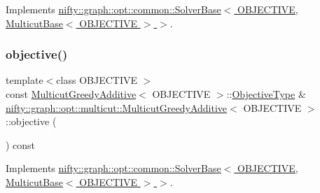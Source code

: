 Implements \hyperlink{classnifty_1_1graph_1_1opt_1_1common_1_1SolverBase_af638b9a804cfec3e35fe87c77e942d30}{nifty\+::graph\+::opt\+::common\+::\+Solver\+Base$<$ O\+B\+J\+E\+C\+T\+I\+V\+E, Multicut\+Base$<$ O\+B\+J\+E\+C\+T\+I\+V\+E $>$ $>$}.

\mbox{\label{classnifty_1_1graph_1_1opt_1_1multicut_1_1MulticutGreedyAdditive_a7138955d26965ef84ce9dc6781f27c18}} 
\subsubsection{\texorpdfstring{objective()}{objective()}}
{\footnotesize\ttfamily template$<$class O\+B\+J\+E\+C\+T\+I\+VE $>$ \\
const \hyperlink{classnifty_1_1graph_1_1opt_1_1multicut_1_1MulticutGreedyAdditive}{Multicut\+Greedy\+Additive}$<$ O\+B\+J\+E\+C\+T\+I\+VE $>$\+::\hyperlink{classnifty_1_1graph_1_1opt_1_1multicut_1_1MulticutGreedyAdditive_a20bb4420504be890fcb487d70fa51dc0}{Objective\+Type} \& \hyperlink{classnifty_1_1graph_1_1opt_1_1multicut_1_1MulticutGreedyAdditive}{nifty\+::graph\+::opt\+::multicut\+::\+Multicut\+Greedy\+Additive}$<$ O\+B\+J\+E\+C\+T\+I\+VE $>$\+::objective (\begin{DoxyParamCaption}{ }\end{DoxyParamCaption}) const\hspace{0.3cm}{\ttfamily [virtual]}}



Implements \hyperlink{classnifty_1_1graph_1_1opt_1_1common_1_1SolverBase_a55e9eb645c07d6e0782ebfb990ab3c84}{nifty\+::graph\+::opt\+::common\+::\+Solver\+Base$<$ O\+B\+J\+E\+C\+T\+I\+V\+E, Multicut\+Base$<$ O\+B\+J\+E\+C\+T\+I\+V\+E $>$ $>$}.

\mbox{\label{classnifty_1_1graph_1_1opt_1_1multicut_1_1MulticutGreedyAdditive_a1e4a7dfa8bc136b8954133928962915a}} 

